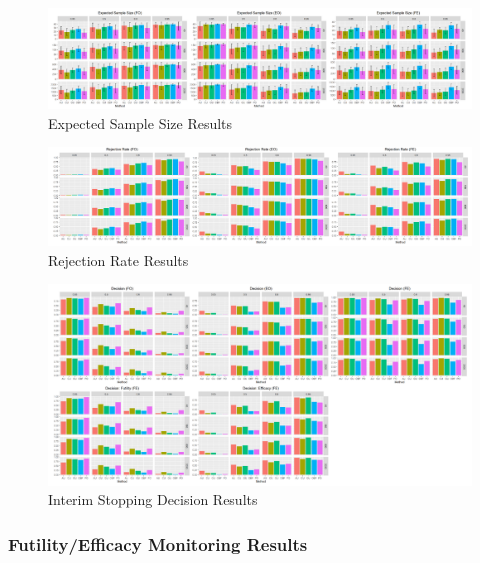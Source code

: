 \documentclass[Afour,sageh,times,square,numbers]{sagej}
\begin{document}
\begin{figure}[t]
  \begin{minipage}[t]{1\linewidth}
    \includegraphics[width=\linewidth]{Fig2.png}
    \caption{Expected Sample Size Results}
    \label{fig:second}
  \end{minipage}\hfill%
\end{figure}
\begin{figure}[t]
  \begin{minipage}[t]{1\linewidth}
    \includegraphics[width=\linewidth]{Fig3.png}
    \caption{Rejection Rate Results}
    \label{fig:third}
  \end{minipage}\hfill%
\end{figure}
\begin{figure}[t]
  \begin{minipage}[t]{1\linewidth}
    \includegraphics[width=\linewidth]{Fig4.png}
    \caption{Interim Stopping Decision Results}
    \label{fig:fourth}
  \end{minipage}\hfill%
\end{figure}

\subsubsection{Futility/Efficacy Monitoring Results}
\end{document}
